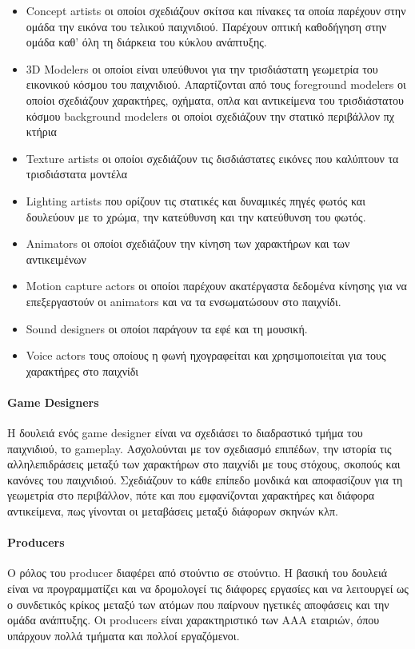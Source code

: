 	\begin{itemize}
		\item Concept artists οι οποίοι σχεδιάζουν σκίτσα και πίνακες τα οποία παρέχουν στην ομάδα την εικόνα του τελικού παιχνιδιού. Παρέχουν οπτική καθοδήγηση στην ομάδα καθ' όλη τη διάρκεια του κύκλου ανάπτυξης.
		\item 3D Modelers οι οποίοι είναι υπεύθυνοι για την τρισδιάστατη γεωμετρία του εικονικού κόσμου του παιχνιδιού. Απαρτίζονται από τους
		foreground modelers οι οποίοι σχεδιάζουν χαρακτήρες, οχήματα, οπλα και αντικείμενα του τρισδιάστατου κόσμου
		background modelers οι οποίοι σχεδιάζουν την στατικό περιβάλλον πχ κτήρια
		\item Texture artists οι οποίοι σχεδιάζουν τις δισδιάστατες εικόνες που καλύπτουν τα τρισδιάστατα μοντέλα
		\item Lighting artists που ορίζουν τις στατικές και δυναμικές πηγές φωτός και δουλεύουν με το χρώμα, την κατεύθυνση και την κατεύθυνση του φωτός.
		\item Animators οι οποίοι σχεδιάζουν την κίνηση των χαρακτήρων και των αντικειμένων
		\item Motion capture actors οι οποίοι παρέχουν ακατέργαστα δεδομένα κίνησης για να επεξεργαστούν οι animators και να τα ενσωματώσουν στο παιχνίδι.
		\item Sound designers οι οποίοι παράγουν τα εφέ και τη μουσική.
		\item Voice actors τους οποίους η φωνή ηχογραφείται και χρησιμοποιείται για τους χαρακτήρες στο παιχνίδι
	\end{itemize}
	
	\paragraph{Game Designers}
	Η δουλειά ενός game designer είναι να σχεδιάσει το διαδραστικό τμήμα του παιχνιδιού, το gameplay. Ασχολούνται με τον σχεδιασμό επιπέδων, την ιστορία τις αλληλεπιδράσεις μεταξύ των χαρακτήρων στο παιχνίδι με τους στόχους, σκοπούς και κανόνες του παιχνιδιού.
	Σχεδιάζουν το κάθε επίπεδο μονδικά και αποφασίζουν για τη γεωμετρία στο περιβάλλον, πότε και που εμφανίζονται χαρακτήρες και διάφορα αντικείμενα, πως γίνονται οι μεταβάσεις μεταξύ διάφορων σκηνών κλπ.
	
	\paragraph{Producers}
	Ο ρόλος του producer διαφέρει από στούντιο σε στούντιο. Η βασική του δουλειά είναι να προγραμματίζει και να δρομολογεί τις διάφορες εργασίες και να λειτουργεί ως ο συνδετικός κρίκος μεταξύ των ατόμων που παίρνουν ηγετικές αποφάσεις και την ομάδα ανάπτυξης. Οι producers είναι χαρακτηριστικό των ΑΑΑ εταιριών, όπου υπάρχουν πολλά τμήματα και πολλοί εργαζόμενοι.	
	
